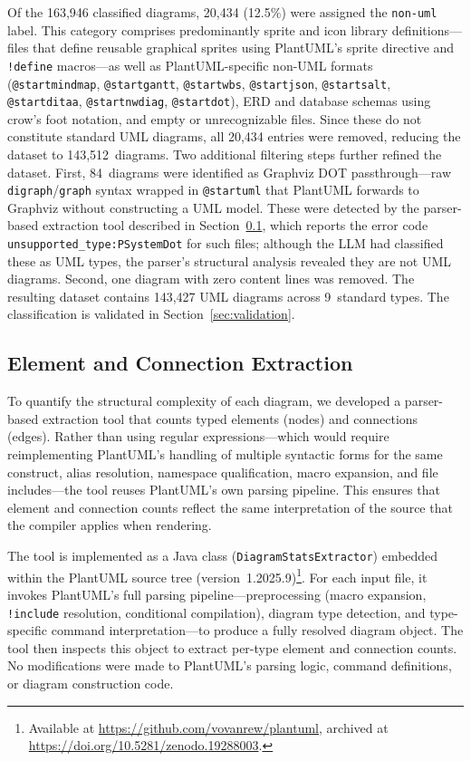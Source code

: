 \documentclass[11pt]{article}
\begin{document}
Of the 163,946 classified diagrams, 20,434 (12.5\%) were assigned the \texttt{non-uml} label. This category comprises predominantly sprite and icon library definitions---files that define reusable graphical sprites using PlantUML's sprite directive and \texttt{!define} macros---as well as PlantUML-specific non-UML formats (\texttt{@startmindmap}, \texttt{@startgantt}, \texttt{@startwbs}, \texttt{@startjson}, \texttt{@startsalt}, \texttt{@startditaa}, \texttt{@startnwdiag}, \texttt{@startdot}), ERD and database schemas using crow's foot notation, and empty or unrecognizable files. Since these do not constitute standard UML diagrams, all 20,434 entries were removed, reducing the dataset to 143,512~diagrams. Two additional filtering steps further refined the dataset. First, 84~diagrams were identified as Graphviz DOT passthrough---raw \texttt{digraph}/\texttt{graph} syntax wrapped in \texttt{@startuml} that PlantUML forwards to Graphviz without constructing a UML model. These were detected by the parser-based extraction tool described in Section~\ref{sec:element-extraction}, which reports the error code \texttt{unsupported\_type:PSystemDot} for such files; although the LLM had classified these as UML types, the parser's structural analysis revealed they are not UML diagrams. Second, one diagram with zero content lines was removed. The resulting dataset contains 143,427 UML diagrams across 9~standard types. The classification is validated in Section~\ref{sec:validation}.

\subsection{Element and Connection Extraction}
\label{sec:element-extraction}

To quantify the structural complexity of each diagram, we developed a parser-based extraction tool that counts typed elements (nodes) and connections (edges). Rather than using regular expressions---which would require reimplementing PlantUML's handling of multiple syntactic forms for the same construct, alias resolution, namespace qualification, macro expansion, and file includes---the tool reuses PlantUML's own parsing pipeline. This ensures that element and connection counts reflect the same interpretation of the source that the compiler applies when rendering.

The tool is implemented as a Java class (\texttt{DiagramStatsExtractor}) embedded within the PlantUML source tree (version~1.2025.9)\footnote{Available at \url{https://github.com/vovanrew/plantuml}, archived at \url{https://doi.org/10.5281/zenodo.19288003}.}. For each input file, it invokes PlantUML's full parsing pipeline---preprocessing (macro expansion, \texttt{!include} resolution, conditional compilation), diagram type detection, and type-specific command interpretation---to produce a fully resolved diagram object. The tool then inspects this object to extract per-type element and connection counts. No modifications were made to PlantUML's parsing logic, command definitions, or diagram construction code.
\end{document}
